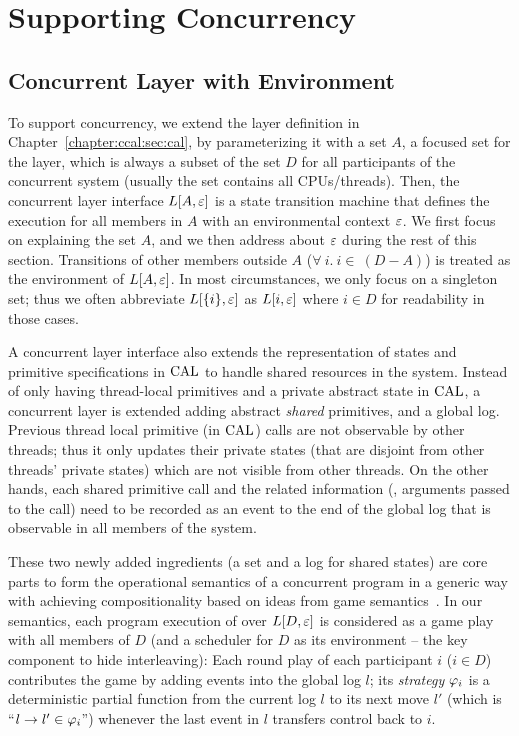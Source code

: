 \section{Supporting Concurrency}
\label{chapter:ccal:sec:ccal-overview}

\subsection{Concurrent Layer with Environment}
\label{chapter:ccal:subsec:concurrent-layer-with-environment}

To support concurrency, 
we extend the layer definition in Chapter~\ref{chapter:ccal:sec:cal},
by parameterizing it with a set $A$, 
a focused set for the layer, which is always a subset of the set $D$ for all participants of the concurrent system (usually the set contains all CPUs/threads).
Then, the concurrent layer interface $L[A, {\varepsilon}]$ is a state transition machine
that defines the execution for all members in $A$ with an environmental context ${\varepsilon}$.
We first focus on explaining the set $A$, and we then address about ${\varepsilon}$ during the rest of this section.
Transitions of other members outside $A$  ($\forall \ i . \ i \in\ (D - A)$)
is treated as the environment of $L[A, {\varepsilon}]$. 
In most circumstances, we only focus on a singleton set; 
thus we often abbreviate $L[\{i\},{\varepsilon}]$ as $L[i, {\varepsilon}]$ where $i\in{}D$ for readability in those cases.

A concurrent layer interface also extends the representation of states and primitive specifications in $\mathrm{CAL}$ to handle shared resources in the system. 
Instead of only having thread-local primitives and a private abstract state in $\mathrm{CAL}$, 
a concurrent layer is extended adding abstract \textit{shared} primitives, 
and a global log. 
Previous thread local primitive (in $\mathrm{CAL}$) calls are not observable by other threads; thus it only updates their private states (that are disjoint from other threads' private states) which are not visible from other threads. 
On the other hands, each shared primitive call and the related information (\ie, arguments passed to the call) 
need to be recorded as an event to the end of the global log that
is observable in all members of the system.

These two newly added ingredients (a set and a log for shared states)  are core parts to form the operational semantics of a concurrent program 
 in a generic way with achieving  compositionality based on
ideas from game semantics~\cite{gsinvite}. 
In our semantics, 
each program execution of  over 
$L[D, {\varepsilon}]$ is considered as a game play with all members of $D$ 
(and a scheduler for $D$ as its environment -- the key component to hide interleaving):
Each round play of each participant $i$ ($i\in{}D$) contributes the game 
by adding events into the global log $l$; its {\em strategy}
$\varphi_{i}$ is a deterministic partial function from
the current log $l$ to its next move $l'$ (which is ``$l \rightarrow l' \in \varphi_{i}$'') whenever
the last event in $l$ transfers control back to $i$. 

